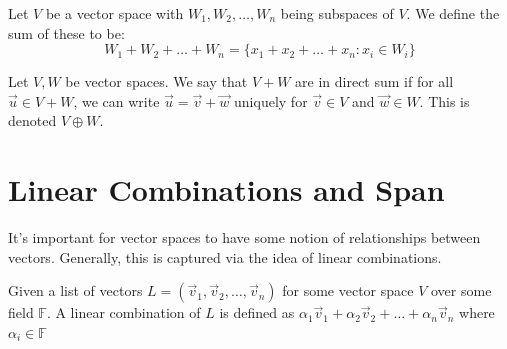 \begin{definition}
    Let $V$ be a vector space with $W_1,W_2,\dots, W_n$ being subspaces of $V$. We define the sum of these to be:
    $$W_1+W_2+\dots+W_n=\{x_1+x_2+\dots+x_n:x_i\in W_i\}$$
\end{definition}

\begin{definition}
    Let $V,W$ be vector spaces. We say that $V+W$ are in direct sum if for all $\vec{u}\in V+W$, we can write $\vec{u}=\vec{v}+\vec{w}$ uniquely for $\vec{v}\in V$ and $\vec{w}\in W$. This is denoted $V\oplus W$.
\end{definition}

\section{Linear Combinations and Span}
It's important for vector spaces to have some notion of relationships between vectors. Generally, this is captured via the idea of linear combinations.
\begin{definition}
    Given a list of vectors $L=(\vec{v}_1,\vec{v}_2,\ldots,\vec{v}_n)$ for some vector space $V$ over some field $\mathbb{F}$. A linear combination of $L$ is defined as $\alpha_1\vec{v}_1+\alpha_2\vec{v}_2+\ldots+\alpha_n\vec{v}_n$ where $\alpha_i\in\mathbb{F}$
\end{definition}

